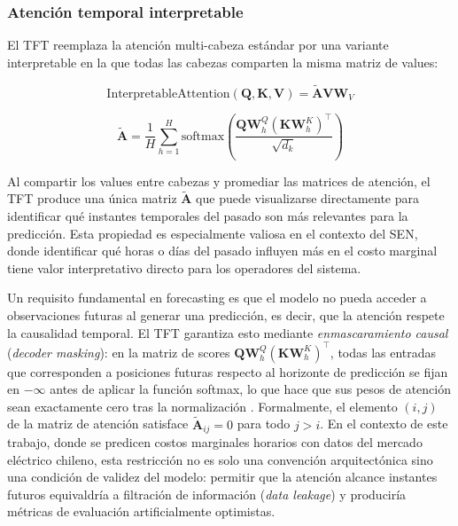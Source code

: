 \subsubsection{Atención temporal interpretable}

El TFT reemplaza la atención multi-cabeza estándar por una variante interpretable en la que todas las cabezas comparten la misma matriz de values:

\begin{equation}
\text{InterpretableAttention}(\mathbf{Q}, \mathbf{K}, \mathbf{V}) = \tilde{\mathbf{A}}\mathbf{V}\mathbf{W}_V
\end{equation}

\begin{equation}
\tilde{\mathbf{A}} = \frac{1}{H}\sum_{h=1}^{H} \text{softmax}\left(\frac{\mathbf{Q}\mathbf{W}_h^Q (\mathbf{K}\mathbf{W}_h^K)^\top}{\sqrt{d_k}}\right)
\end{equation}

Al compartir los values entre cabezas y promediar las matrices de atención, el TFT produce una única matriz $\tilde{\mathbf{A}}$ que puede visualizarse directamente para identificar qué instantes temporales del pasado son más relevantes para la predicción. Esta propiedad es especialmente valiosa en el contexto del SEN, donde identificar qué horas o días del pasado influyen más en el costo marginal tiene valor interpretativo directo para los operadores del sistema.

Un requisito fundamental en forecasting es que el modelo no pueda acceder a observaciones futuras al generar una predicción, es decir, que la atención respete la causalidad temporal. El TFT garantiza esto mediante \textit{enmascaramiento causal} (\textit{decoder masking}): en la matriz de scores $\mathbf{Q}\mathbf{W}_h^Q(\mathbf{K}\mathbf{W}_h^K)^\top$, todas las entradas que corresponden a posiciones futuras respecto al horizonte de predicción se fijan en $-\infty$ antes de aplicar la función softmax, lo que hace que sus pesos de atención sean exactamente cero tras la normalización \cite{Vaswani2017Attention, TFT}. Formalmente, el elemento $(i,j)$ de la matriz de atención satisface $\tilde{\mathbf{A}}_{ij} = 0$ para todo $j > i$. En el contexto de este trabajo, donde se predicen costos marginales horarios con datos del mercado eléctrico chileno, esta restricción no es solo una convención arquitectónica sino una condición de validez del modelo: permitir que la atención alcance instantes futuros equivaldría a filtración de información (\textit{data leakage}) y produciría métricas de evaluación artificialmente optimistas.

